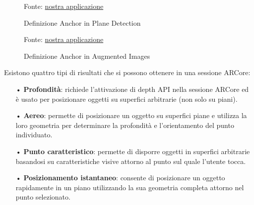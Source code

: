 \documentclass[crop=false, class=book]{standalone}
\begin{document}
	\begin{figure}
			\centering
			{Fonte: \url{nostra  applicazione}}
			\caption{Definizione Anchor in Plane Detection}
			\label{fig: Definizione Anchor in Plane Detection}
	\end{figure}
	\vspace{0.2cm}
	\begin{figure}
			\centering
			{Fonte: \url{nostra  applicazione}}
			\caption{Definizione Anchor in Augmented Images}
			\label{fig: Definizione Anchor in Augmented Images}
	\end{figure}
		
		Esistono quattro tipi di risultati che si possono ottenere in una sessione ARCore:
		\begin{itemize}
		\item[•] \textbf{Profondità}: richiede l'attivazione di depth API nella sessione ARCore ed è usato per posizionare oggetti su superfici arbitrarie (non solo su piani).
		\item[•]\textbf{Aereo}: permette di posizionare un oggetto su superfici piane e utilizza la loro geometria per determinare la profondità e l'orientamento del punto individuato.
		\item[•] \textbf{Punto caratteristico}: permette di disporre oggetti in superfici arbitrarie basandosi su caratteristiche visive attorno al punto sul quale l'utente tocca. 
		\item[•] \textbf{Posizionamento istantaneo}: consente di posizionare un oggetto rapidamente in un piano utilizzando la sua geometria completa attorno nel punto selezionato. 
	\end{itemize}
	
\end{document}
